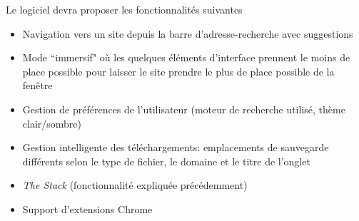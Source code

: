 \documentclass{article}
\begin{document}
Le logiciel devra proposer les fonctionnalités suivantes

\begin{itemize}
    \item Navigation vers un site depuis la barre d'adresse-recherche avec suggestions
    \item Mode ``immersif" où les quelques éléments d'interface prennent le moins de place possible pour laisser le site prendre le plus de place possible de la fenêtre
    \item Gestion de préférences de l'utilisateur (moteur de recherche utilisé, thème clair/sombre)
    \item Gestion intelligente des téléchargements: emplacements de sauvegarde différents selon le type de fichier, le domaine et le titre de l'onglet
    \item \emph{The Stack} (fonctionnalité expliquée précédemment)
    \item Support d'extensions Chrome
\end{itemize}
\end{document}
